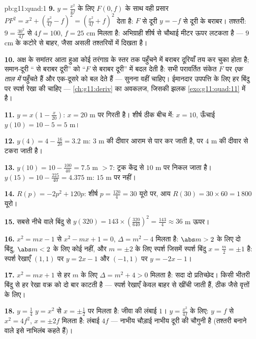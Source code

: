 \begin{solution}{pb:g11:quad:1}
\textbf{9.} $y = \frac{x^2}{4f}$ के लिए $F(0, f)$ के साथ वही प्रसार $PF^2 = x^2 + \left(\frac{x^2}{4f} - f\right)^2
= \left(\frac{x^2}{4f} + f\right)^2$ देता है: $F$ से
दूरी $y = -f$ से दूरी के बराबर। तश्तरी: $9 = \frac{30^2}{4f}$ से $4f = 100$, $f = 25$ cm मिलता है:
अभिग्राही शीर्ष से चौथाई मीटर ऊपर लटकता है --- $9$ cm के कटोरे से बाहर,
जैसा असली तश्तरियों में दिखता है।

\textbf{10.} अक्ष के समांतर आता हुआ कोई तरंगाग्र  के स्तर तक पहुँचने में
बराबर दूरियाँ तय कर चुका होता है; समान-दूरी `` से बराबर दूरी'' को
``$F$ से बराबर दूरी'' में बदल देती है: सभी परावर्तित संकेत $F$ पर
\emph{एक ताल में} पहुँचते हैं और एक-दूसरे को बल देते हैं --- सुनना वहीं
चाहिए। ईमानदार उपपत्ति के लिए हर बिंदु पर स्पर्श रेखा की  चाहिए ---
\cref{ch:g11:deriv} का अवकलज, जिसकी झलक \cref{exo:g11:quad:11} में है।

\textbf{11.} $y = x\left(1 - \frac{x}{20}\right)$: $x = 20$ m पर गिरती है। शीर्ष ठीक बीच में: $x = 10$, ऊँचाई
$y(10) = 10 - 5 = 5$ m।

\textbf{12.} $y(4) = 4 - \frac{16}{20} = 3.2$ m: $3$ m की दीवार आराम से पार कर जाती है, पर $4$ m की
दीवार से टकरा जाती है।

\textbf{13.} $y(10) = 10 - \frac{100}{40} = 7.5$ m $> 7$: ट्रक केंद्र से $10$ m पर निकल जाता है। $y(15) = 10 - \frac{225}{40}
= 4.375$
m: $15$ m पर नहीं।

\textbf{14.} $R(p) = -2p^2 + 120p$: शीर्ष $p = \frac{120}{4} = 30$ यूरो पर, आय $R(30) = 30 \times 60 = 1\,800$ यूरो।

\textbf{15.} सबसे नीचे वाले बिंदु से $y(320) = 143 \times \left(\frac{320}{640}\right)^2
= \frac{143}{4} \approx 36$ m ऊपर।

\textbf{16.} $x^2 = mx - 1$ से $x^2 - mx + 1 = 0$, $\Delta = m^2 - 4$ मिलता है: $\abs m > 2$ के लिए दो बिंदु, $\abs m < 2$
के लिए कोई नहीं, और $m = \pm 2$ के लिए स्पर्श जिसमें स्पर्श बिंदु $x = \frac m2 = \pm 1$ है: स्पर्श
रेखाएँ $(1, 1)$ पर $y = 2x - 1$ और $(-1, 1)$ पर $y = -2x - 1$।

\textbf{17.} $x^2 = mx + 1$ से हर $m$ के लिए $\Delta = m^2 + 4 > 0$ मिलता है: सदा दो प्रतिच्छेद।
किसी भीतरी बिंदु से हर रेखा वक्र को दो बार काटती है --- स्पर्श रेखाएँ केवल
बाहर से खींची जाती हैं, ठीक जैसे वृत्तों के लिए।

\textbf{18.} $y = \frac14$ $y = x^2$ से $x = \pm\frac12$ पर मिलता है: जीवा की लंबाई $1$। $y = \frac{x^2}{4f}$
के लिए: $y = f$ से $x^2 = 4f^2$, $x = \pm 2f$ मिलता है: लंबाई $4f$ --- नाभीय चौड़ाई नाभीय
दूरी की चौगुनी है (तश्तरी बनाने वाले इसे नाभिलंब कहते हैं)।


\end{solution}

